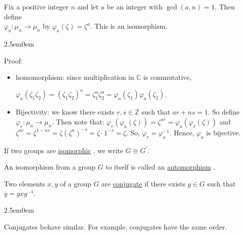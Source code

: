\documentclass{book}
\newcommand{\hOne}{%
   \color{Black}%
   \fontsize{14}{16}\selectfont%
}
\newcommand{\hTwo}{%
\color{MidnightBlue}%
   \fontsize{13}{15}\selectfont%
}
\newcommand{\exTwoP}{%
   \color{RedViolet}%
   \fontsize{13}{15}\selectfont%
}
\newenvironment{myIndent}{%
   \begin{adjustwidth}{2.5em}{0em}%
}{%
   \end{adjustwidth}%
}
\newcommand{\udefine}[1]{{%
   \setulcolor{Red}%
   \setul{0.14em}{0.07em}%
   \ul{#1}%
}}
\newcommand{\iso}{\cong}
\newcommand{\mySepTwo}[1][.]{%
   {\noindent\color{#1}{\rule{6.5in}{0.5mm}}}\\%
}
\newcommand{\retTwo}{\hfill\bigbreak}
\begin{document}
Fix a positive integer $n$ and let $a$ be an integer with $\gcd(a, n) = 1$. Then define\\ $\varphi_a: \mu_n \longrightarrow \mu_n$ by $\varphi_a(\zeta) = \zeta^a$. This is an isomorphism.

\begin{myIndent}\exTwoP
	Proof:\\ [-20pt]
	\begin{itemize}
		\item homomorphism: since multiplication in $\mathbb{C}$ is commutative, 
		
		{\centering $\varphi_a(\zeta_1\zeta_2) = (\zeta_1\zeta_2)^a = \zeta_1^a\zeta_2^a = \varphi_a(\zeta_1)\varphi_a(\zeta_2)$.\retTwo\par}

		\item Bijectivity: we know there exists $r, s \in \mathbb{Z}$ such that $ar + ns = 1$. So define\\ $\varphi_r: \mu_n \longrightarrow \mu_n$. Then note that: $\varphi_r(\varphi_a(\zeta)) = \zeta^{ar} = \varphi_a(\varphi_r(\zeta))$ and\\ $\zeta^{ar} = \zeta^{1-ns} = \zeta(\zeta^n)^{-s} = \zeta \cdot 1^{-s} = \zeta$. So, $\varphi_r = \varphi_a^{-1}$. Hence, $\varphi_a$ is bijective.\retTwo
	\end{itemize}
\end{myIndent}

\hOne
If two groups are \udefine{isomorphic}, we write $G \iso G^\prime$.\retTwo

An isomorphism from a group $G$ to itself is called an \udefine{automorphism}.\retTwo

Two elements $x, y$ of a group $G$ are \udefine{conjugate} if there exists $g \in G$ such that $y = gxg^{-1}$.

\begin{myIndent}\hTwo
	Conjugates behave similar. For example, conjugates have the same order.\retTwo
\end{myIndent}

\mySepTwo
\end{document}

